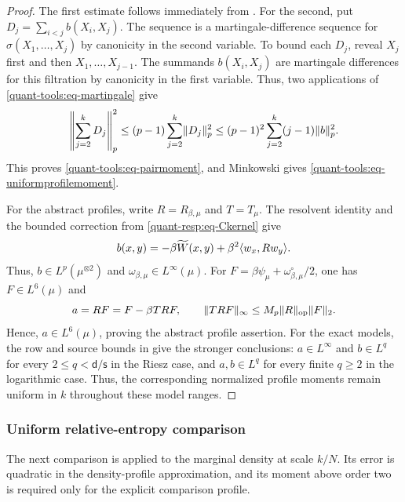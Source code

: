 \documentclass[11pt,reqno]{amsart}
\numberwithin{equation}{section}
\theoremstyle{plain}
\theoremstyle{remark}
\DeclarePairedDelimiter{\norm}{\lVert}{\rVert}
\DeclarePairedDelimiter{\ipp}{\langle}{\rangle}
\renewcommand{\d}{\mathsf{d}}
\newcommand{\tl}{\widetilde}
\newcommand{\be}{\beta}
\newcommand{\s}{\mathsf{s}}
\begin{document}
\begin{proof}
The first estimate follows immediately from . For the second, put $D_j=\sum_{i<j}b(X_i,X_j)$. The sequence is a martingale-difference sequence for $\sigma(X_1,\ldots,X_j)$ by canonicity in the second variable. To bound each $D_j$, reveal $X_j$ first and then $X_1,\ldots,X_{j-1}$. The summands $b(X_i,X_j)$ are martingale differences for this filtration by canonicity in the first variable. Thus, two applications of \eqref{quant-tools:eq-martingale} give
\begin{equation}\label{quant-tools:eq-twomartingales}
 \left\|\sum_{j=2}^kD_j\right\|_p^2
 \leq(p-1)\sum_{j=2}^k\norm{D_j}_p^2
 \leq(p-1)^2\sum_{j=2}^k(j-1)\norm b_p^2.
\end{equation}
This proves \eqref{quant-tools:eq-pairmoment}, and Minkowski gives \eqref{quant-tools:eq-uniformprofilemoment}.

For the abstract profiles, write $R=R_{\be,\mu}$ and $T=T_\mu$.
The resolvent identity and the bounded correction from
\eqref{quant-resp:eq-Ckernel} give
\begin{equation}\label{quant-tools:eq-bdecomposition}
 b(x,y)=-\be\tl W(x,y)+\be^2\ipp*{w_x,Rw_y}.
\end{equation}
Thus, $b\in L^p(\mu^{\otimes2})$ and $\omega_{\be,\mu}\in L^\infty(\mu)$.
For $F=\be\psi_\mu+\omega_{\be,\mu}^{\circ}/2$, one has $F\in L^6(\mu)$
and
\begin{equation}\label{quant-tools:eq-amoments}
 a=RF=F-\be TRF,\qquad
 \norm{TRF}_\infty\leq M_p\norm R_{\mathrm{op}}\norm F_2.
\end{equation}
Hence, $a\in L^6(\mu)$, proving the abstract profile assertion.
For the exact models, the row and source bounds in
 give the
stronger conclusions: $a\in L^\infty$ and $b\in L^q$ for every
$2\leq q<\d/\s$ in the Riesz case, and $a,b\in L^q$ for every finite
$q\geq2$ in the logarithmic case.  Thus, the corresponding normalized
profile moments remain uniform in $k$ throughout these model ranges.
\end{proof}

\subsubsection{Uniform relative-entropy comparison}\label{quant-tools:sec-entropy}

The next comparison is applied to the marginal density at scale $k/N$.  Its error is quadratic in the density-profile approximation, and its moment above order two is required only for the explicit comparison profile.
\end{document}
